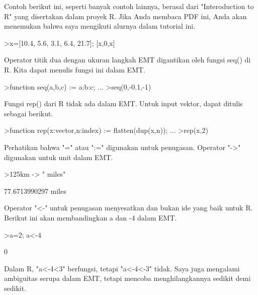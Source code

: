 \documentclass[a4paper,10pt]{article}
\begin{document}
\begin{eulernotebook}
\begin{eulercomment}
Contoh berikut ini, seperti banyak contoh lainnya, berasal dari
"Interoduction to R" yang disertakan dalam proyek R. Jika Anda membaca
PDF ini, Anda akan menemukan bahwa saya mengikuti alurnya dalam
tutorial ini.
\end{eulercomment}
\begin{eulerprompt}
>x=[10.4, 5.6, 3.1, 6.4, 21.7]; [x,0,x]
\end{eulerprompt}
\begin{euleroutput}
  [10.4,  5.6,  3.1,  6.4,  21.7,  0,  10.4,  5.6,  3.1,  6.4,  21.7]
\end{euleroutput}
\begin{eulercomment}
Operator titik dua dengan ukuran langkah EMT digantikan oleh fungsi
seq() di R. Kita dapat menulis fungsi ini dalam EMT.
\end{eulercomment}
\begin{eulerprompt}
>function seq(a,b,c) := a:b:c; ...
>seq(0,-0.1,-1)
\end{eulerprompt}
\begin{euleroutput}
  [0,  -0.1,  -0.2,  -0.3,  -0.4,  -0.5,  -0.6,  -0.7,  -0.8,  -0.9,  -1]
\end{euleroutput}
\begin{eulercomment}
Fungsi rep() dari R tidak ada dalam EMT. Untuk input vektor, dapat
ditulis sebagai berikut.
\end{eulercomment}
\begin{eulerprompt}
>function rep(x:vector,n:index) := flatten(dup(x,n)); ...
>rep(x,2)
\end{eulerprompt}
\begin{euleroutput}
  [10.4,  5.6,  3.1,  6.4,  21.7,  10.4,  5.6,  3.1,  6.4,  21.7]
\end{euleroutput}
\begin{eulercomment}
Perhatikan bahwa "=" atau ":=" digunakan untuk penugasan. Operator
"-\textgreater{}" digunakan untuk unit dalam EMT.
\end{eulercomment}
\begin{eulerprompt}
>125km -> " miles"
\end{eulerprompt}
\begin{euleroutput}
  77.6713990297 miles
\end{euleroutput}
\begin{eulercomment}
Operator "\textless{}-" untuk penugasan menyesatkan dan bukan ide yang baik
untuk R. Berikut ini akan membandingkan a dan -4 dalam EMT.
\end{eulercomment}
\begin{eulerprompt}
>a=2; a<-4
\end{eulerprompt}
\begin{euleroutput}
  0
\end{euleroutput}
\begin{eulercomment}
Dalam R, "a\textless{}-4\textless{}3" berfungsi, tetapi "a\textless{}-4\textless{}-3" tidak. Saya juga
mengalami ambiguitas serupa dalam EMT, tetapi mencoba menghilangkannya
sedikit demi sedikit.


\end{eulercomment}
\end{eulernotebook}
\end{document}
